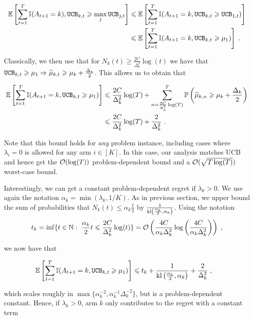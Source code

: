 \begin{align*}
\mathbb{E}\left[\sum_{t=1}^T \mathbb{I}(A_{t+1}=k), \texttt{UCB}_{k, t}\geqslant \max_j \texttt{UCB}_{j, t}\right] & \leqslant \mathbb{E}\left[\sum_{t=1}^T \mathbb{I}(A_{t+1}=k, \texttt{UCB}_{k, t}\geqslant \texttt{UCB}_{1, t})\right] \\
& \leqslant \mathbb{E}\left[\sum_{t=1}^T \mathbb{I}(A_{t+1}=k, \texttt{UCB}_{k, t}\geqslant \mu_1)\right] \;. \end{align*}

Classically, we then use that for $N_k(t)\geq \frac{2C}{\Delta_k^2} \log(t)$ we have that $\texttt{UCB}_{k, t}\geqslant \mu_1 \Rightarrow \widehat{\mu}_{k, t} \geqslant \mu_k + \frac{\Delta_k}{2}$. This allows us to obtain that 

\begin{align*}
\mathbb{E}\left[\sum_{t=1}^T \mathbb{I}(A_{t+1}=k, \texttt{UCB}_{k, t}\geqslant \mu_1)\right] &\leqslant \frac{2C}{\Delta_k^2} \log(T) + \sum_{n=\frac{2C}{\Delta_k^2} \log(T)}^T \mathbb{P}\left(\widehat{\mu}_{k, n}\geqslant \mu_k + \frac{\Delta_k}{2}\right) \\
& \leqslant \frac{2C}{\Delta_k^2} \log(T) + \frac{2}{\Delta_k^2} \;.
\end{align*}

Note that this bound holds for \emph{any} problem instance, including cases where $\lambda_i = 0$ is allowed for any arm $i \in [K]$. In this case, our analysis matches UCB and hence get the $\mathcal{O}(\log(T))$ problem-dependent bound and a $\mathcal{O}(\sqrt{T\log(T)})$ worst-case bound.

Interestingly, we can get a constant problem-dependent regret if $\lambda_k>0$. We use again the notation $\alpha_k=\min(\lambda_k, 1/K)$. As in previous section, we upper bound the sum of probabilities that $N_k(t)\leq \alpha_k \frac{t}{2}$ by $\frac{1}{\text{\normalfont kl}\left(\frac{\alpha_k}{2}, \alpha_k\right)}$. Using the notation \[t_k = \inf\{t\in \mathbb{N}: \; \frac{\alpha_k}{2}t\leqslant \frac{2C}{\Delta_k^2} \log(t) \}= \mathcal{O}\left(\frac{4C}{\alpha_k \Delta_k^2}\log\left(\frac{4C}{\alpha_k\Delta_k^2}\right)\right)\;,\]

we now have that 

\begin{align*}
\mathbb{E}\left[\sum_{t=1}^T \mathbb{I}(A_{t+1}=k, \texttt{UCB}_{k, t}\geqslant \mu_1)\right] &\leqslant t_k + \frac{1}{\text{\normalfont kl}\left(\frac{\alpha_k}{2}, \alpha_k\right)} + \frac{2}{\Delta_k^2} \;,
\end{align*}

which scales roughly in $\max\{\alpha_k^{-2}, \alpha_k^{-1}\Delta_k^{-2} \}$, but is a problem-dependent constant. Hence, if $\lambda_k>0$, arm $k$ only contributes to the regret with a constant term 

